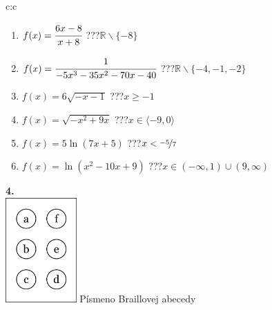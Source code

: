 \documentclass[10pt]{report}
\begin{document}
\begin{tabular}{c:c}
\begin{minipage}[c][104.5mm][t]{0.5\linewidth}
\begin{center}
\begin{minipage}{0.79\linewidth}
\begin{center}
\begin{varwidth}{\linewidth}
\begin{enumerate}
\item $f(x)=\cfrac{6x-8}{x+8}$\quad \dotfill\; ???\;\dotfill \quad $\mathbb{R}\smallsetminus\{-8\}$
\item $f(x)=\cfrac{1}{-5x^3-35x^2-70x-40}$\quad \dotfill\; ???\;\dotfill \quad $\mathbb{R}\smallsetminus\{-4,-1,-2\}$
\item $f(x)=6\sqrt{-x-1}$\quad \dotfill\; ???\;\dotfill \quad $x\geq-1$
\item $f(x)=\sqrt{-x^2+9x}$\quad \dotfill\; ???\;\dotfill \quad $x\in\langle-9 , 0\rangle$
\item $f(x)=5\ln{(7x+5)}$\quad \dotfill\; ???\;\dotfill \quad $x<\nicefrac{-5}{7}$
\item $f(x)=\ln{(x^2-10x+9)}$\quad \dotfill\; ???\;\dotfill \quad $x\in(-\infty , 1)\cup(9 , \infty)$
\end{enumerate}
\end{varwidth}
\end{center}
\end{minipage}
\begin{minipage}{0.20\linewidth}
\begin{center}
{\Huge\bfseries 4.} \\[2mm]
\includegraphics[height=40mm]{../images/braille.png}
{\small Písmeno Braillovej abecedy}
\end{center}
\end{minipage}
\end{center}
\end{minipage}
%
\end{tabular}
\newpage
\thispagestyle{empty}
\end{document}

